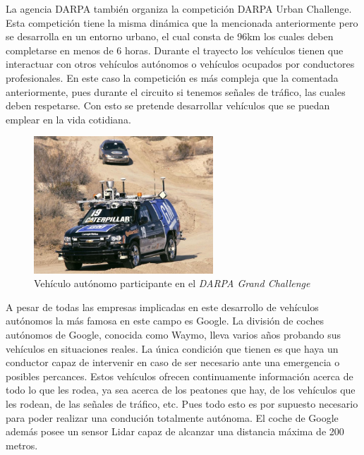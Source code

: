 La agencia DARPA también organiza la competición DARPA Urban Challenge. Esta competición tiene la misma dinámica que la mencionada anteriormente pero se desarrolla en un entorno urbano, el cual consta de 96km los cuales deben completarse en menos de 6 horas. Durante el trayecto los vehículos tienen que interactuar con otros vehículos autónomos o vehículos ocupados por conductores profesionales. En este caso la competición es más compleja que la comentada anteriormente, pues durante el circuito si tenemos señales de tráfico, las cuales deben respetarse. Con esto se pretende desarrollar vehículos que se puedan emplear en la vida cotidiana.

\begin{figure}[H]
  \begin{center}
    \includegraphics[width=0.6\textwidth]{figures/Introduccion/darpa.jpg}
		\caption{ Vehículo autónomo participante en el \textit{DARPA Grand Challenge}}
		\label{fig.darpa}
		\end{center}
\end{figure}


A pesar de todas las empresas implicadas en este desarrollo de vehículos autónomos la más famosa en este campo es Google. La división de coches autónomos de Google, conocida como Waymo, lleva varios años probando sus vehículos en situaciones reales. La única condición que tienen es que haya un conductor capaz de intervenir en caso de ser necesario ante una emergencia o posibles percances. Estos vehículos ofrecen continuamente información acerca de todo lo que les rodea, ya sea acerca de los peatones que hay, de los vehículos que les rodean, de las señales de tráfico, etc. Pues todo esto es por supuesto necesario para poder realizar una condución totalmente autónoma. El coche de Google además posee un sensor Lidar capaz de alcanzar una distancia máxima de 200 metros.

